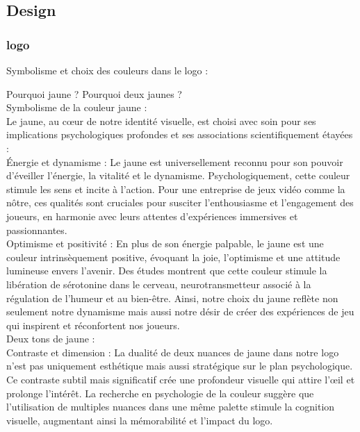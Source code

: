 
\subsection{Design}

\subsubsection{logo}
Symbolisme et choix des couleurs dans le logo :

Pourquoi jaune ? Pourquoi deux jaunes ?
\\

Symbolisme de la couleur jaune :
\\

Le jaune, au cœur de notre identité visuelle, est choisi avec soin pour ses implications psychologiques profondes et ses associations scientifiquement étayées :
\\

Énergie et dynamisme : Le jaune est universellement reconnu pour son pouvoir d'éveiller l'énergie, la vitalité et le dynamisme. Psychologiquement, cette couleur stimule les sens et incite à l'action. Pour une entreprise de jeux vidéo comme la nôtre, ces qualités sont cruciales pour susciter l'enthousiasme et l'engagement des joueurs, en harmonie avec leurs attentes d'expériences immersives et passionnantes.
\\

Optimisme et positivité : En plus de son énergie palpable, le jaune est une couleur intrinsèquement positive, évoquant la joie, l'optimisme et une attitude lumineuse envers l'avenir. Des études montrent que cette couleur stimule la libération de sérotonine dans le cerveau, neurotransmetteur associé à la régulation de l'humeur et au bien-être. Ainsi, notre choix du jaune reflète non seulement notre dynamisme mais aussi notre désir de créer des expériences de jeu qui inspirent et réconfortent nos joueurs.
\\

Deux tons de jaune :
\\

Contraste et dimension : La dualité de deux nuances de jaune dans notre logo n'est pas uniquement esthétique mais aussi stratégique sur le plan psychologique. Ce contraste subtil mais significatif crée une profondeur visuelle qui attire l'œil et prolonge l'intérêt. La recherche en psychologie de la couleur suggère que l'utilisation de multiples nuances dans une même palette stimule la cognition visuelle, augmentant ainsi la mémorabilité et l'impact du logo.
\\

